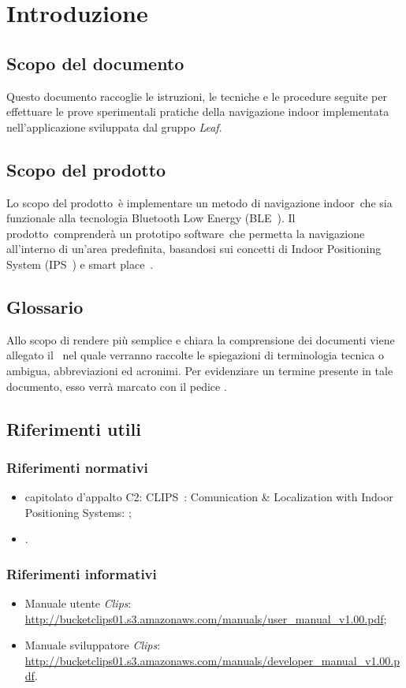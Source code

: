 \documentclass[../Sperimentazioni.tex]{subfiles}
\begin{document}
\section{Introduzione}

	\subsection{Scopo del documento}
		Questo documento raccoglie le istruzioni, le tecniche e le procedure seguite per effettuare le prove sperimentali pratiche della navigazione indoor implementata nell'applicazione sviluppata dal gruppo \textit{Leaf}.
	
	\subsection{Scopo del prodotto}
		Lo scopo del prodotto\g\ è implementare un metodo di navigazione indoor\g\ che sia funzionale alla tecnologia Bluetooth Low Energy (BLE\g\ ). Il prodotto\g\ comprenderà un prototipo software\g\ che permetta la navigazione all'interno di un'area predefinita, basandosi sui concetti di Indoor Positioning System (IPS\g\ ) e smart place\g\ .
	
	\subsection{Glossario} \label{sec:Glossario}
	Allo scopo di rendere più semplice e chiara la comprensione dei documenti viene allegato il \glossariov\ nel quale verranno raccolte le spiegazioni di  terminologia tecnica o  ambigua, abbreviazioni ed acronimi. Per evidenziare un termine presente in tale documento, esso verrà marcato con il pedice \g .
	
	
	\subsection{Riferimenti utili}
	
		\subsubsection{Riferimenti normativi}
		\begin{itemize}
			\item capitolato d'appalto C2: CLIPS\g\ : Comunication \& Localization with Indoor Positioning Systems:
			;
			\item \normediprogettov.
		\end{itemize}
		
		\subsubsection{Riferimenti informativi}
		\begin{itemize}
			\item Manuale utente \textit{Clips}: \url{http://bucketclips01.s3.amazonaws.com/manuals/user_manual_v1.00.pdf};
			\item Manuale sviluppatore \textit{Clips}: \url{http://bucketclips01.s3.amazonaws.com/manuals/developer_manual_v1.00.pdf}.
		\end{itemize}
		
\end{document}
